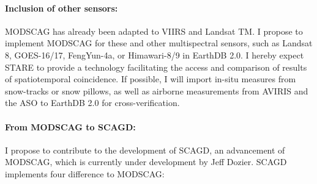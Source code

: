 \documentclass[letterpaper, parskip=half]{scrartcl}
\begin{document}
\paragraph{Inclusion of other sensors:}
MODSCAG has already been adapted to VIIRS and Landsat TM. I propose to implement MODSCAG for these and other multispectral sensors, such as Landsat 8, \gls{GOES}-16/17, FengYun-4a, or Himawari-8/9 in EarthDB 2.0. I hereby expect STARE to provide a technology facilitating the access and comparison of results of spatiotemporal coincidence. If possible, I will import in-situ measures from snow-tracks or snow pillows, as well as airborne measurements from \gls{AVIRIS} and the \gls{ASO} to EarthDB 2.0 for cross-verification.

\paragraph{From \gls{MODSCAG} to \gls{SCAGD}:}
I propose to contribute to the development of \gls{SCAGD}, an advancement of \gls{MODSCAG}, which is currently under development by Jeff Dozier.
\gls{SCAGD} implements four difference to \gls{MODSCAG}:
\end{document}
